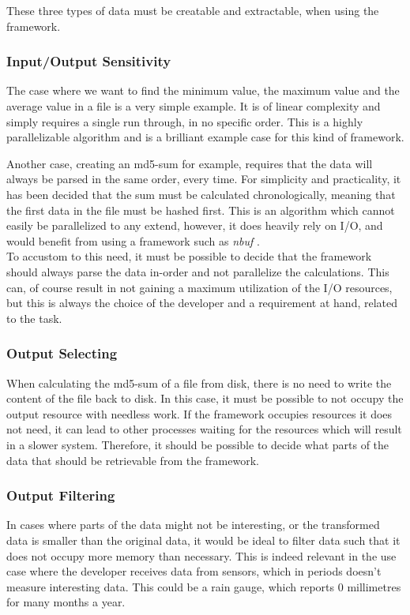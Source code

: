 \documentclass[a4paper]{article}
\newcommand{\nbuf}{\textit{nbuf} }
\begin{document}
These three types of data must be creatable and extractable, when using the framework.


\subsubsection{Input/Output Sensitivity}
The case where we want to find the minimum value, the maximum value and the average value in a file is a very simple example. It is of linear complexity and simply requires a single run through, in no specific order. This is a highly parallelizable algorithm and is a brilliant example case for this kind of framework. 

Another case, creating an md5-sum for example, requires that the data will always be parsed in the same order, every time. For simplicity and practicality, it has been decided that the sum must be calculated chronologically, meaning that the first data in the file must be hashed first. This is an algorithm which cannot easily be parallelized to any extend, however, it does heavily rely on I/O, and would benefit from using a framework such as \nbuf.\\

To accustom to this need, it must be possible to decide that the framework should always parse the data in-order and not parallelize the calculations. This can, of course result in not gaining a maximum utilization of the I/O resources, but this is always the choice of the developer and a requirement at hand, related to the task. 


\subsubsection{Output Selecting}
When calculating the md5-sum of a file from disk, there is no need to write the content of the file back to disk. In this case, it must be possible to not occupy the output resource with needless work. If the framework occupies resources it does not need, it can lead to other processes waiting for the resources which will result in a slower system. Therefore, it should be possible to decide what parts of the data that should be retrievable from the framework.


\subsubsection{Output Filtering}
In cases where parts of the data might not be interesting, or the transformed data is smaller than the original data, it would be ideal to filter data such that it does not occupy more memory than necessary. This is indeed relevant in the use case where the developer receives data from sensors, which in periods doesn't measure interesting data. This could be a rain gauge, which reports 0 millimetres for many months a year.
\end{document}
